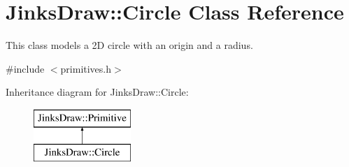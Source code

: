 \hypertarget{class_jinks_draw_1_1_circle}{}\section{Jinks\+Draw\+:\+:Circle Class Reference}
\label{class_jinks_draw_1_1_circle}


This class models a 2D circle with an origin and a radius.  




{\ttfamily \#include $<$primitives.\+h$>$}

Inheritance diagram for Jinks\+Draw\+:\+:Circle\+:\begin{figure}[H]
\begin{center}
\leavevmode
\includegraphics[height=2.000000cm]{class_jinks_draw_1_1_circle}
\end{center}
\end{figure}
